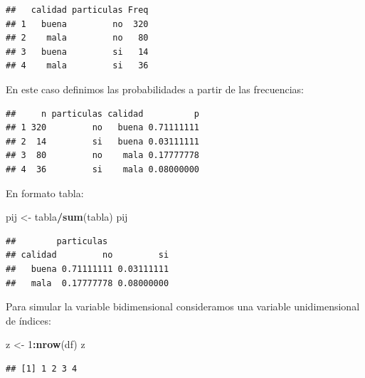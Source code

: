 \documentclass[
]{book}
\newenvironment{Shaded}{\begin{snugshade}}{\end{snugshade}}
\newcommand{\DecValTok}[1]{\textcolor[rgb]{0.00,0.00,0.81}{#1}}
\newcommand{\KeywordTok}[1]{\textcolor[rgb]{0.13,0.29,0.53}{\textbf{#1}}}
\newcommand{\NormalTok}[1]{#1}
\newcommand{\OperatorTok}[1]{\textcolor[rgb]{0.81,0.36,0.00}{\textbf{#1}}}
\newcommand{\StringTok}[1]{\textcolor[rgb]{0.31,0.60,0.02}{#1}}
\theoremstyle{break}
\theoremstyle{definition}
\theoremstyle{definition}
\theoremstyle{definition}
\theoremstyle{remark}
\begin{document}
\begin{verbatim}
##   calidad particulas Freq
## 1   buena         no  320
## 2    mala         no   80
## 3   buena         si   14
## 4    mala         si   36
\end{verbatim}

En este caso definimos las probabilidades a partir de las frecuencias:

\begin{Shaded}
\end{Shaded}

\begin{verbatim}
##     n particulas calidad          p
## 1 320         no   buena 0.71111111
## 2  14         si   buena 0.03111111
## 3  80         no    mala 0.17777778
## 4  36         si    mala 0.08000000
\end{verbatim}

En formato tabla:

\begin{Shaded}
\begin{Highlighting}[]
\NormalTok{pij <-}\StringTok{ }\NormalTok{tabla}\OperatorTok{/}\KeywordTok{sum}\NormalTok{(tabla)}
\NormalTok{pij}
\end{Highlighting}
\end{Shaded}

\begin{verbatim}
##        particulas
## calidad         no         si
##   buena 0.71111111 0.03111111
##   mala  0.17777778 0.08000000
\end{verbatim}

Para simular la variable bidimensional consideramos una variable
unidimensional de índices:

\begin{Shaded}
\begin{Highlighting}[]
\NormalTok{z <-}\StringTok{ }\DecValTok{1}\OperatorTok{:}\KeywordTok{nrow}\NormalTok{(df)}
\NormalTok{z}
\end{Highlighting}
\end{Shaded}

\begin{verbatim}
## [1] 1 2 3 4
\end{verbatim}
\end{document}
